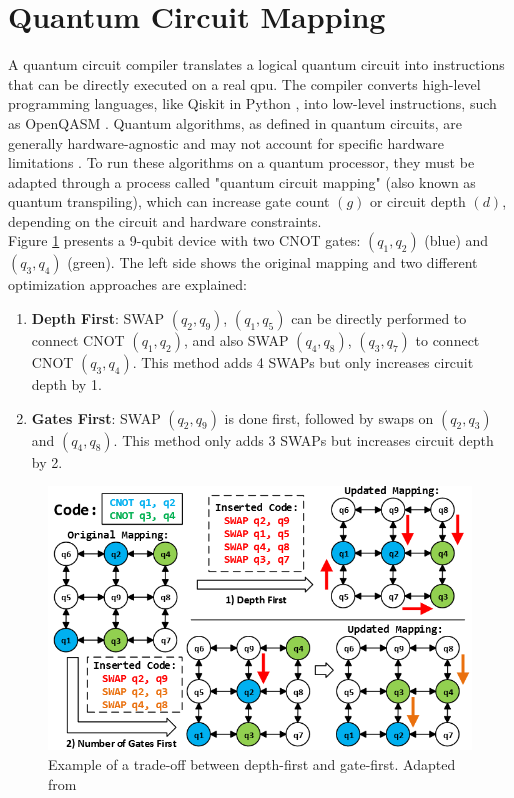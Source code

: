 \section{Quantum Circuit Mapping} %
A quantum circuit compiler translates a logical quantum circuit into instructions that can be directly executed on a real \acrshort{qpu}. The compiler converts high-level programming languages, like Qiskit in Python \cite{aleksandrowicz_qiskit_2019}, into low-level instructions, such as OpenQASM \cite{cross_open_2017}. Quantum algorithms, as defined in quantum circuits, are generally hardware-agnostic and may not account for specific hardware limitations \cite{ash-saki_qure_2019}. To run these algorithms on a quantum processor, they must be adapted through a process called "quantum circuit mapping" (also known as quantum transpiling), which can increase gate count $(g)$ or circuit depth $(d)$, depending on the circuit and hardware constraints. \\
Figure \ref{fig:tackling-depth-gate-first} presents a 9-qubit device with two CNOT gates: $(q_1, q_2)$ (blue) and $(q_3, q_4)$ (green). The left side shows the original mapping and two different optimization approaches are explained:
\begin{enumerate}
    \item \textbf{Depth First}: SWAP $(q_2, q_9)$, $(q_1, q_5)$ can be directly performed to connect CNOT $(q_1, q_2)$, and also SWAP $(q_4, q_8)$, $(q_3, q_7)$ to connect CNOT $(q_3, q_4)$. This method adds 4 SWAPs but only increases circuit depth by 1.
    \item \textbf{Gates First}: SWAP $(q_2, q_9)$ is done first, followed by swaps on $(q_2, q_3)$ and $(q_4, q_8)$. This method only adds 3 SWAPs but increases circuit depth by 2.
\end{enumerate} 
\begin{figure}[htb]
    \centering
    \includegraphics[width=0.6\linewidth]{image/tackling_depth_gate_first.png}
    \caption{Example of a trade-off between depth-first and gate-first. Adapted from \cite{li_tackling_2019}}
    \label{fig:tackling-depth-gate-first}
\end{figure}

